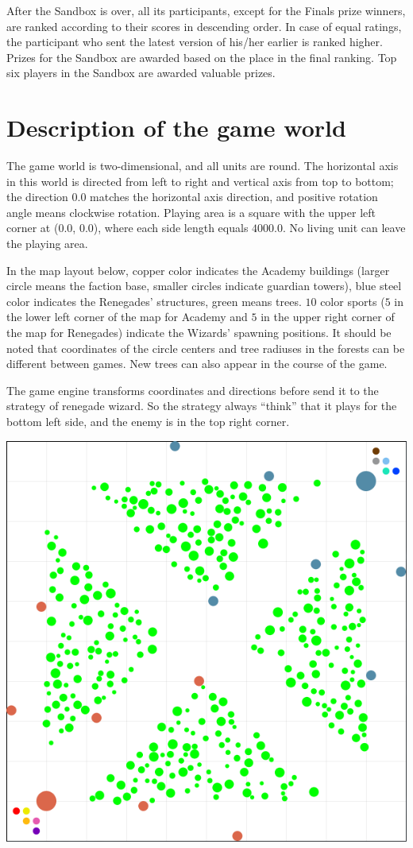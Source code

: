 After the Sandbox is over, all its participants, except for the Finals prize winners, are ranked according to their scores in descending order. In case of equal ratings, the participant
who sent the latest version of his/her earlier is ranked higher. Prizes for the Sandbox are awarded based
on the place in the final ranking. Top six players in the Sandbox are awarded valuable prizes.
 
\section{Description of the game world}
 
The game world is two-dimensional, and all units are round. The horizontal axis in this world is directed from left to right and vertical axis from top to bottom; the direction $0.0$ matches the horizontal axis direction, and positive rotation angle means clockwise rotation. Playing
area is a square with the upper left corner at ($0.0$, $0.0$), where each side length equals $4000.0$. No living
unit can leave the playing area.

\newpage
In the map layout below, copper color indicates the Academy buildings (larger circle means the faction base, smaller circles
indicate guardian towers), blue steel color indicates the Renegades’ structures, green means trees. $10$ color sports ($5$ in the lower left
corner of the map for Academy and $5$ in the upper right corner of the map for Renegades) indicate the Wizards’ spawning positions. It should be noted that
coordinates of the circle centers and tree radiuses in the forests can be different between games. New trees can also appear in the course of
the game.

The game engine transforms coordinates and directions before send it to the strategy of renegade wizard. So the strategy always ``think''
that it plays for the bottom left side, and the enemy is in the top right corner.

\includegraphics{images/map.png}

